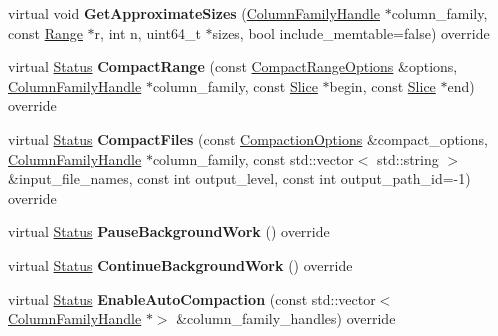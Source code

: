 \begin{DoxyCompactItemize}
\item 
virtual void {\bfseries Get\+Approximate\+Sizes} (\hyperlink{classrocksdb_1_1ColumnFamilyHandle}{Column\+Family\+Handle} $\ast$column\+\_\+family, const \hyperlink{structrocksdb_1_1Range}{Range} $\ast$r, int n, uint64\+\_\+t $\ast$sizes, bool include\+\_\+memtable=false) override\hypertarget{classrocksdb_1_1StackableDB_a80e38429d5f6f31bdbfba8236022f579}{}\label{classrocksdb_1_1StackableDB_a80e38429d5f6f31bdbfba8236022f579}

\item 
virtual \hyperlink{classrocksdb_1_1Status}{Status} {\bfseries Compact\+Range} (const \hyperlink{structrocksdb_1_1CompactRangeOptions}{Compact\+Range\+Options} \&options, \hyperlink{classrocksdb_1_1ColumnFamilyHandle}{Column\+Family\+Handle} $\ast$column\+\_\+family, const \hyperlink{classrocksdb_1_1Slice}{Slice} $\ast$begin, const \hyperlink{classrocksdb_1_1Slice}{Slice} $\ast$end) override\hypertarget{classrocksdb_1_1StackableDB_a105e01c821c91e3f47a977203182cfaa}{}\label{classrocksdb_1_1StackableDB_a105e01c821c91e3f47a977203182cfaa}

\item 
virtual \hyperlink{classrocksdb_1_1Status}{Status} {\bfseries Compact\+Files} (const \hyperlink{structrocksdb_1_1CompactionOptions}{Compaction\+Options} \&compact\+\_\+options, \hyperlink{classrocksdb_1_1ColumnFamilyHandle}{Column\+Family\+Handle} $\ast$column\+\_\+family, const std\+::vector$<$ std\+::string $>$ \&input\+\_\+file\+\_\+names, const int output\+\_\+level, const int output\+\_\+path\+\_\+id=-\/1) override\hypertarget{classrocksdb_1_1StackableDB_a666823ea453a2e148bc971e9cb347f64}{}\label{classrocksdb_1_1StackableDB_a666823ea453a2e148bc971e9cb347f64}

\item 
virtual \hyperlink{classrocksdb_1_1Status}{Status} {\bfseries Pause\+Background\+Work} () override\hypertarget{classrocksdb_1_1StackableDB_a060e3abf45d3c6f8ea67a561cfd030e5}{}\label{classrocksdb_1_1StackableDB_a060e3abf45d3c6f8ea67a561cfd030e5}

\item 
virtual \hyperlink{classrocksdb_1_1Status}{Status} {\bfseries Continue\+Background\+Work} () override\hypertarget{classrocksdb_1_1StackableDB_a66e977bae430717a0254716a64988781}{}\label{classrocksdb_1_1StackableDB_a66e977bae430717a0254716a64988781}

\item 
virtual \hyperlink{classrocksdb_1_1Status}{Status} {\bfseries Enable\+Auto\+Compaction} (const std\+::vector$<$ \hyperlink{classrocksdb_1_1ColumnFamilyHandle}{Column\+Family\+Handle} $\ast$$>$ \&column\+\_\+family\+\_\+handles) override\hypertarget{classrocksdb_1_1StackableDB_a6189d0e0e9de1c51997083f9baf68134}{}\label{classrocksdb_1_1StackableDB_a6189d0e0e9de1c51997083f9baf68134}


\end{DoxyCompactItemize}
